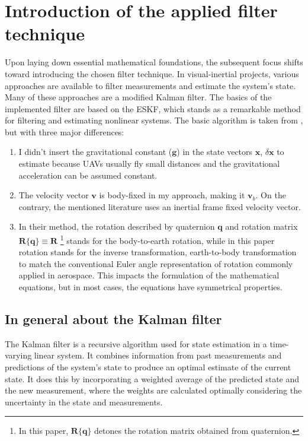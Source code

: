 \chapter{Introduction of the applied filter technique}
\label{chap:eskf}

Upon laying down essential mathematical foundations, the subsequent focus shifts toward introducing the chosen filter technique. In visual-inertial projects, various approaches are available to filter measurements and estimate the system's state. Many of these approaches are a modified Kalman filter. The basics of the implemented filter are based on the ESKF, which stands as a remarkable method for filtering and estimating nonlinear systems. The basic algorithm is taken from \cite{quaternion-eskf}, but with three major differences:
\begin{enumerate}
    \item 
    I didn't insert the gravitational constant ($\mathbf{g}$)  in the state vectors $\mathbf{x}$, $\delta\mathbf{x}$ to estimate because UAVs usually fly small distances and the gravitational acceleration can be assumed constant.
    
    \item
    The velocity vector $\mathbf{v}$ is body-fixed in my approach, making it $\mathbf{v}_b$. On the contrary, the mentioned literature uses an inertial frame fixed velocity vector.
    
    \item 
    In their method, the rotation described by quaternion $\mathbf{q}$ and rotation matrix $\mathbf{R}\{\mathbf{q}\}\equiv\mathbf{R}$ \footnote{In this paper, $\mathbf{R}\{\mathbf{q}\}$ detones the rotation matrix obtained from quaternion.} stands for the body-to-earth rotation, while in this paper rotation stands for the inverse transformation, earth-to-body transformation to match the conventional Euler angle representation of rotation commonly applied in aerospace. This impacts the formulation of the mathematical equations, but in most cases, the equations have symmetrical properties.
\end{enumerate}

\section{In general about the Kalman filter}

 The Kalman filter is a recursive algorithm used for state estimation in a time-varying linear system. It combines information from past measurements and predictions of the system's state to produce an optimal estimate of the current state. It does this by incorporating a weighted average of the predicted state and the new measurement, where the weights are calculated optimally considering the uncertainty in the state and measurements.

